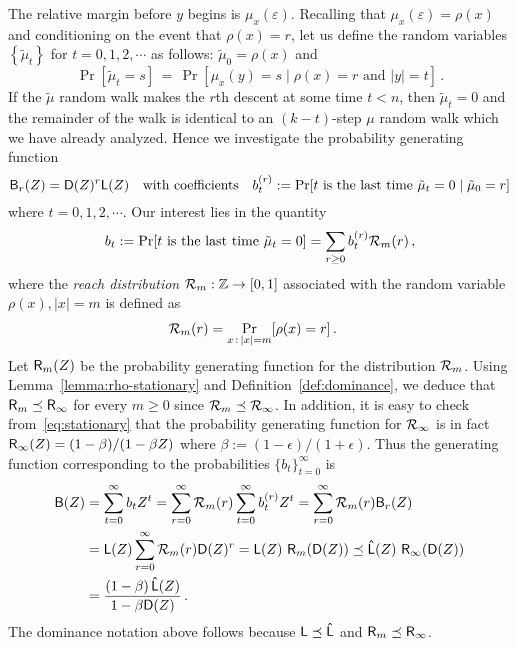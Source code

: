         The relative margin before $y$ begins is $\mu_x(\varepsilon)$.
        Recalling that $\mu_x(\varepsilon) = \rho(x)$ and conditioning on the event that $\rho(x) = r$, 
    let us define the random variables $\left\{ \tilde{\mu}_t \right\}$ for $t = 0, 1, 2, \cdots$ as follows: $\tilde{\mu}_0 = \rho(x)$ and
    \[
      \Pr[\tilde{\mu}_t = s]\, =\, \Pr[\mu_x(y) = s \mid \rho(x) = r \text{ and } |y| = t ]
      \, .
    \]
    If the $\tilde{\mu}$ random walk makes the $r$th descent at some time $t < n$, then $\tilde{\mu}_t = 0$ and the remainder of the walk is 
	identical to an $(k-t)$-step $\mu$ random walk which we have already analyzed. 
	Hence we investigate the probability generating function
	\[
			\mathsf{B}_r(Z) = \mathsf{D}(Z)^r \mathsf{L}(Z) \quad \text{with coefficients} \quad
      b^{(r)}_t := \Pr[t \text{ is the last time } \tilde{\mu}_t = 0 \mid \tilde{\mu}_0 = r]	
  \]
  where $t = 0, 1, 2, \cdots$. Our interest lies in the quantity 
    \[
      b_t 
      := \Pr[t \text{ is the last time } \tilde{\mu}_t = 0] 
      = \sum_{r\geq 0}{  b^{(r)}_t \mathcal{R}_m(r) } 
      \,,
     \]
  where the \emph{reach distribution} 
  $\mathcal{R}_m : \mathbb{Z} \rightarrow [0,1]$ 
  associated with the random variable $\rho(x), |x| = m$ is defined as 
  \begin{align}\label{eq:dist-rho}
    \mathcal{R}_m(r) &= \Pr_{x \, : \, |x| = m}[\rho(x) = r]
    \, .
  \end{align}
     Let $\mathsf{R}_m(Z)$ be the probability generating function
     for the distribution $\mathcal{R}_m$. 
     Using Lemma~\ref{lemma:rho-stationary} and Definition~\ref{def:dominance}, we deduce that
     $\mathsf{R}_m \preceq \mathsf{R}_\infty$ for every $m \geq 0$ since 
    $\mathcal{R}_m \preceq \mathcal{R}_\infty$.
     In addition, it is easy to check from~\eqref{eq:stationary} that
     the probability generating function for $\mathcal{R}_\infty$ is in fact
     $\mathsf{R}_\infty(Z) = (1-\beta)/(1-\beta Z)$ where $\beta := (1-\epsilon)/(1+\epsilon)$. 
    Thus the generating function corresponding to the
     probabilities $\{b_t\}_{t=0}^\infty$ is
	\begin{align}
		\mathsf{B}(Z) 
		&= \sum_{t=0}^\infty{b_t Z^t} = \sum_{r=0}^\infty{\mathcal{R}_m(r) \sum_{t=0}^\infty{b_t^{(r)} Z^t} } = \sum_{r=0}^\infty{\mathcal{R}_m(r) \mathsf{B}_r(Z) } \nonumber \\
    &= \mathsf{L}(Z) \sum_{r=0}^\infty{\mathcal{R}_m(r) \mathsf{D}(Z)^r}    \nonumber 
		= \mathsf{L}(Z)\  \mathsf{R}_m (\mathsf{D}(Z)) \nonumber 
		\preceq \mathsf{\hat{L}}(Z)\  \mathsf{R}_\infty (\mathsf{D}(Z))  \nonumber \\
    &= \frac{(1-\beta)\,\mathsf{\hat{L}}(Z) }{1 - \beta \mathsf{D}(Z)}
		\, .
	\label{eq:gf-mu-relative}
	\end{align}
  The dominance notation above follows because
  $\mathsf{L} \preceq \mathsf{\hat{L}}$ and $\mathsf{R}_m \preceq \mathsf{R}_\infty$.


